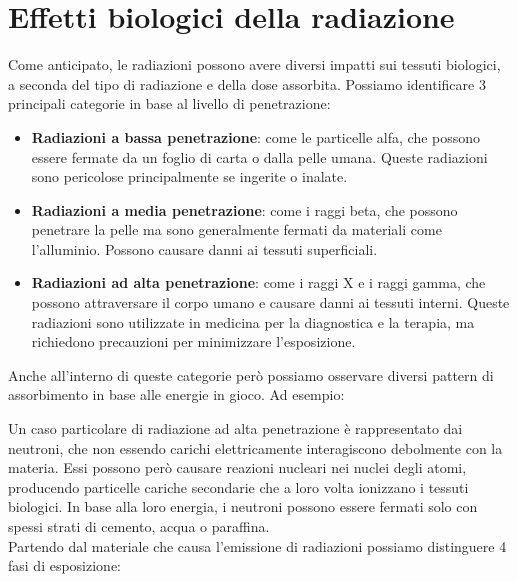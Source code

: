 \section{Effetti biologici della radiazione}
Come anticipato, le radiazioni possono avere diversi impatti sui tessuti biologici, a seconda del tipo di radiazione e della dose assorbita. Possiamo identificare 3 principali categorie in base al livello di penetrazione:
\begin{itemize}
    \item \textbf{Radiazioni a bassa penetrazione}: come le particelle alfa, che possono essere fermate da un foglio di carta o dalla pelle umana. Queste radiazioni sono pericolose principalmente se ingerite o inalate.
    \item \textbf{Radiazioni a media penetrazione}: come i raggi beta, che possono penetrare la pelle ma sono generalmente fermati da materiali come l'alluminio. Possono causare danni ai tessuti superficiali.
    \item \textbf{Radiazioni ad alta penetrazione}: come i raggi X e i raggi gamma, che possono attraversare il corpo umano e causare danni ai tessuti interni. Queste radiazioni sono utilizzate in medicina per la diagnostica e la terapia, ma richiedono precauzioni per minimizzare l'esposizione.
\end{itemize}
Anche all'interno di queste categorie però possiamo osservare diversi pattern di assorbimento in base alle energie in gioco. Ad esempio:


Un caso particolare di radiazione ad alta penetrazione è rappresentato dai neutroni, che non essendo carichi elettricamente interagiscono debolmente con la materia. Essi possono però causare reazioni nucleari nei nuclei degli atomi, producendo particelle cariche secondarie che a loro volta ionizzano i tessuti biologici. In base alla loro energia, i neutroni possono essere fermati solo con spessi strati di cemento, acqua o paraffina.\\
Partendo dal materiale che causa l'emissione di radiazioni possiamo distinguere 4 fasi di esposizione:

